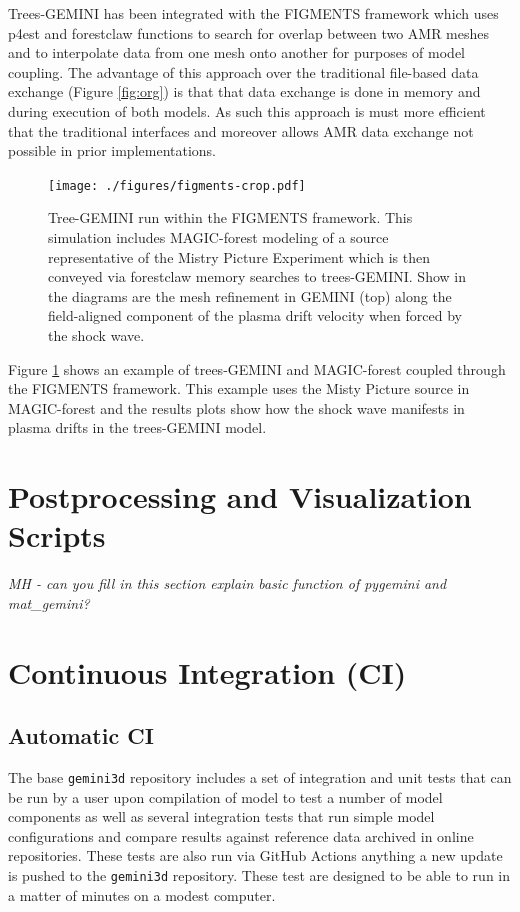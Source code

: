 \documentclass[11pt,letterpaper]{article}
\begin{document}
Trees-GEMINI has been integrated with the FIGMENTS framework which uses p4est and forestclaw functions to search for overlap between two AMR meshes and to interpolate data from one mesh onto another for purposes of model coupling.  The advantage of this approach over the traditional file-based data exchange (Figure \ref{fig:org}) is that that data exchange is done in memory and during execution of both models.  As such this approach is must more efficient that the traditional interfaces and moreover allows AMR data exchange not possible in prior implementations.  
\begin{figure}
  \centering
  \texttt{[image: ./figures/figments-crop.pdf]}
  \caption{Tree-GEMINI run within the FIGMENTS framework.  This simulation includes MAGIC-forest modeling of a source representative of the Mistry Picture Experiment which is then conveyed via forestclaw memory searches to trees-GEMINI.  Show in the diagrams are the mesh refinement in GEMINI (top) along the field-aligned component of the plasma drift velocity when forced by the shock wave.}
  \label{fig:FIGMENTS}
\end{figure}

Figure \ref{fig:FIGMENTS} shows an example of trees-GEMINI and MAGIC-forest coupled through the FIGMENTS framework.  This example uses the Misty Picture source in MAGIC-forest and the results plots show how the shock wave manifests in plasma drifts in the trees-GEMINI model.  


\section{Postprocessing and Visualization Scripts}

\emph{MH - can you fill in this section explain basic function of pygemini and mat\_gemini?}


\section{Continuous Integration (CI)}

\subsection{Automatic CI}

The base \texttt{gemini3d} repository includes a set of integration and unit tests that can be run by a user upon compilation of model to test a number of model components as well as several integration tests that run simple model configurations and compare results against reference data archived in online repositories.  These tests are also run via GitHub Actions anything a new update is pushed to the \texttt{gemini3d} repository.  These test are designed to be able to run in a matter of minutes on a modest computer.  
\end{document}
